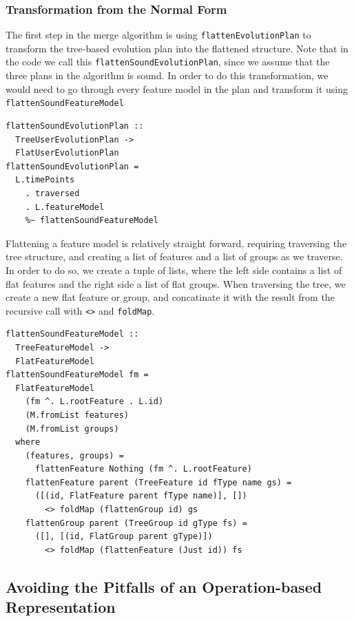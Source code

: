 \documentclass[a4paper,english]{ifimaster}
\begin{document}
\subsubsection{Transformation from the Normal Form}%
\label{ssub:transformation_from_the_normal_form}

The first step in the merge algorithm is using \texttt{flattenEvolutionPlan} to transform the tree-based evolution plan into the flattened structure. Note that in the code we call this \texttt{flattenSoundEvolutionPlan}, since we assume that the three plans in the algorithm is sound. In order to do this transformation, we would need to go through every feature model in the plan and transform it using \texttt{flattenSoundFeatureModel}

\begin{verbatim}
flattenSoundEvolutionPlan :: 
  TreeUserEvolutionPlan -> 
  FlatUserEvolutionPlan
flattenSoundEvolutionPlan =
  L.timePoints
    . traversed
    . L.featureModel
    %~ flattenSoundFeatureModel
\end{verbatim}

Flattening a feature model is relatively straight forward, requiring traversing the tree structure, and creating a list of features and a list of groups as we traverse. In order to do so, we create a tuple of lists, where the left side contains a list of flat features and the right side a list of flat groups. When traversing the tree, we create a new flat feature or group, and concatinate it with the result from the recursive call with \texttt{<>} and \texttt{foldMap}.

\begin{verbatim}
flattenSoundFeatureModel :: 
  TreeFeatureModel -> 
  FlatFeatureModel
flattenSoundFeatureModel fm =
  FlatFeatureModel
    (fm ^. L.rootFeature . L.id)
    (M.fromList features)
    (M.fromList groups)
  where
    (features, groups) = 
      flattenFeature Nothing (fm ^. L.rootFeature)
    flattenFeature parent (TreeFeature id fType name gs) =
      ([(id, FlatFeature parent fType name)], [])
        <> foldMap (flattenGroup id) gs
    flattenGroup parent (TreeGroup id gType fs) =
      ([], [(id, FlatGroup parent gType)])
        <> foldMap (flattenFeature (Just id)) fs
\end{verbatim}

\subsection{Avoiding the Pitfalls of an Operation-based Representation}%
\label{sub:avoiding_the_pitfalls_of_an_operation_based_representation}
\end{document}
